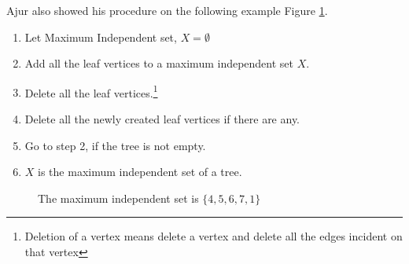Ajur also showed his procedure on the following example Figure \ref{13g4}.
\begin{enumerate}
    \item Let Maximum Independent set, $X=\emptyset$
    \item Add all the leaf vertices to a maximum independent set $X$.
    \item Delete all the leaf vertices.\footnote {Deletion of a vertex means delete a vertex and delete all the edges incident on that vertex}
    \item Delete all the newly created leaf vertices if there are any.
    \item Go to step 2, if the tree is not empty.
    \item $X$ is the maximum independent set of a tree.
\end{enumerate}

\begin{figure}
\begin{center}

\caption{ The maximum independent set is $\{4,5,6,7,1\}$}\label{13g4}
\end{center}
\end{figure}

